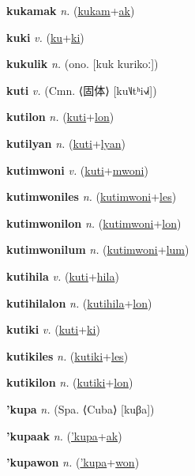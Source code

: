 \textbf{\hypertarget{kukamak}{kukamak}} \textit{n.} (\hyperlink{kukam}{kukam}+\allowbreak \hyperlink{ak}{ak})


\textbf{\hypertarget{kuki}{kuki}} \textit{v.} (\hyperlink{ku}{ku}+\allowbreak \hyperlink{ki}{ki})


\textbf{\hypertarget{kukulik}{kukulik}} \textit{n.} (ono. [kuk kurikoː])


\textbf{\hypertarget{kuti}{kuti}} \textit{v.} (Cmn. ⟨{\chinese{}固体}⟩ [ku˥˩tʰi˧˩˧])


\textbf{\hypertarget{kutilon}{kutilon}} \textit{n.} (\hyperlink{kuti}{kuti}+\allowbreak \hyperlink{lon}{lon})


\textbf{\hypertarget{kutilyan}{kutilyan}} \textit{n.} (\hyperlink{kuti}{kuti}+\allowbreak \hyperlink{lyan}{lyan})


\textbf{\hypertarget{kutimwoni}{kutimwoni}} \textit{v.} (\hyperlink{kuti}{kuti}+\allowbreak \hyperlink{mwoni}{mwoni})


\textbf{\hypertarget{kutimwoniles}{kutimwoniles}} \textit{n.} (\hyperlink{kutimwoni}{kutimwoni}+\allowbreak \hyperlink{les}{les})


\textbf{\hypertarget{kutimwonilon}{kutimwonilon}} \textit{n.} (\hyperlink{kutimwoni}{kutimwoni}+\allowbreak \hyperlink{lon}{lon})


\textbf{\hypertarget{kutimwonilum}{kutimwonilum}} \textit{n.} (\hyperlink{kutimwoni}{kutimwoni}+\allowbreak \hyperlink{lum}{lum})


\textbf{\hypertarget{kutihila}{kutihila}} \textit{v.} (\hyperlink{kuti}{kuti}+\allowbreak \hyperlink{hila}{hila})


\textbf{\hypertarget{kutihilalon}{kutihilalon}} \textit{n.} (\hyperlink{kutihila}{kutihila}+\allowbreak \hyperlink{lon}{lon})


\textbf{\hypertarget{kutiki}{kutiki}} \textit{v.} (\hyperlink{kuti}{kuti}+\allowbreak \hyperlink{ki}{ki})


\textbf{\hypertarget{kutikiles}{kutikiles}} \textit{n.} (\hyperlink{kutiki}{kutiki}+\allowbreak \hyperlink{les}{les})


\textbf{\hypertarget{kutikilon}{kutikilon}} \textit{n.} (\hyperlink{kutiki}{kutiki}+\allowbreak \hyperlink{lon}{lon})


\textbf{\hypertarget{'kupa}{'kupa}} \textit{n.} (Spa. ⟨Cuba⟩ [kuβa])


\textbf{\hypertarget{'kupaak}{'kupaak}} \textit{n.} (\hyperlink{'kupa}{'kupa}+\allowbreak \hyperlink{ak}{ak})


\textbf{\hypertarget{'kupawon}{'kupawon}} \textit{n.} (\hyperlink{'kupa}{'kupa}+\allowbreak \hyperlink{won}{won})


